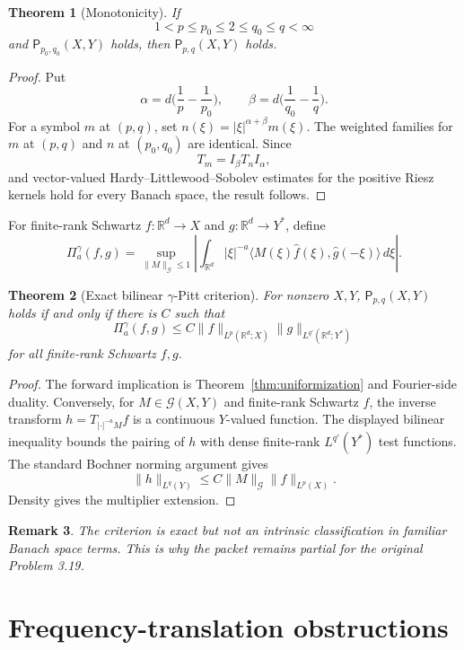 \documentclass[11pt]{article}
\newtheorem{theorem}{Theorem}[section]
\newtheorem{remark}[theorem]{Remark}
\newcommand{\R}{\mathbb R}
\newcommand{\Gcal}{\mathcal G}
\newcommand{\Pprop}{\mathsf P}
\newcommand{\gam}{\gamma}
\newcommand{\norm}[1]{\lVert #1\rVert}
\newcommand{\abs}[1]{\lvert #1\rvert}
\newcommand{\ip}[2]{\langle #1,#2\rangle}
\begin{document}
\begin{theorem}[Monotonicity]\label{thm:monotonicity}
If
\[
  1<p\le p_0\le2\le q_0\le q<\infty
\]
and \(\Pprop_{p_0,q_0}(X,Y)\) holds, then \(\Pprop_{p,q}(X,Y)\) holds.
\end{theorem}

\begin{proof}
Put
\[
  \alpha=d\Big(\frac1p-\frac1{p_0}\Big),\qquad
  \beta=d\Big(\frac1{q_0}-\frac1q\Big).
\]
For a symbol \(m\) at \((p,q)\), set \(n(\xi)=\abs{\xi}^{\alpha+\beta}m(\xi)\).
The weighted families for \(m\) at \((p,q)\) and \(n\) at \((p_0,q_0)\) are
identical.  Since
\[
  T_m=I_\beta T_n I_\alpha,
\]
and vector-valued Hardy--Littlewood--Sobolev estimates for the positive Riesz
kernels hold for every Banach space, the result follows.
\end{proof}

For finite-rank Schwartz \(f:\R^d\to X\) and \(g:\R^d\to Y^*\), define
\[
 \Pi_a^\gam(f,g)=
 \sup_{\norm M_{\Gcal}\le1}
 \left|\int_{\R^d}\abs{\xi}^{-a}
 \ip{M(\xi)\widehat f(\xi)}{\widehat g(-\xi)}\,d\xi\right|.
\]

\begin{theorem}[Exact bilinear \(\gam\)-Pitt criterion]\label{thm:pitt}
For nonzero \(X,Y\), \(\Pprop_{p,q}(X,Y)\) holds if and only if there is
\(C\) such that
\[
  \Pi_a^\gam(f,g)
  \le C\norm f_{L^p(\R^d;X)}\norm g_{L^{q'}(\R^d;Y^*)}
\]
for all finite-rank Schwartz \(f,g\).
\end{theorem}

\begin{proof}
The forward implication is Theorem~\ref{thm:uniformization} and Fourier-side
duality.  Conversely, for \(M\in\Gcal(X,Y)\) and finite-rank Schwartz \(f\), the
inverse transform \(h=T_{\abs{\cdot}^{-a}M}f\) is a continuous \(Y\)-valued
function.  The displayed bilinear inequality bounds the pairing of \(h\) with
dense finite-rank \(L^{q'}(Y^*)\) test functions.  The standard Bochner
norming argument gives
\[
  \norm h_{L^q(Y)}\le C\norm M_{\Gcal}\norm f_{L^p(X)}.
\]
Density gives the multiplier extension.
\end{proof}

\begin{remark}
The criterion is exact but not an intrinsic classification in familiar Banach
space terms.  This is why the packet remains partial for the original Problem
3.19.
\end{remark}

\section{Frequency-translation obstructions}
\end{document}
